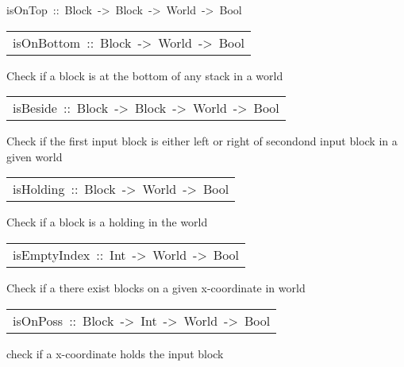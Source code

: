 \begin{haddockdesc}
\item[
isOnTop\ ::\ Block\ ->\ Block\ ->\ World\ ->\ Bool
]
\end{haddockdesc}
\begin{haddockdesc}
\item[\begin{tabular}{@{}l}
isOnBottom\ ::\ Block\ ->\ World\ ->\ Bool
\end{tabular}]\haddockbegindoc
Check if a block is at the bottom of any stack in a world     
\par

\end{haddockdesc}
\begin{haddockdesc}
\item[\begin{tabular}{@{}l}
isBeside\ ::\ Block\ ->\ Block\ ->\ World\ ->\ Bool
\end{tabular}]\haddockbegindoc
Check if the first input block is either left or right of secondond input block in a given world 
\par

\end{haddockdesc}
\begin{haddockdesc}
\item[\begin{tabular}{@{}l}
isHolding\ ::\ Block\ ->\ World\ ->\ Bool
\end{tabular}]\haddockbegindoc
Check if a block is a holding in the world 
\par

\end{haddockdesc}
\begin{haddockdesc}
\item[\begin{tabular}{@{}l}
isEmptyIndex\ ::\ Int\ ->\ World\ ->\ Bool
\end{tabular}]\haddockbegindoc
Check if a there exist blocks on a given x-coordinate in world 
\par

\end{haddockdesc}
\begin{haddockdesc}
\item[\begin{tabular}{@{}l}
isOnPoss\ ::\ Block\ ->\ Int\ ->\ World\ ->\ Bool
\end{tabular}]\haddockbegindoc
check if a x-coordinate holds the input block  
\par

\end{haddockdesc}

